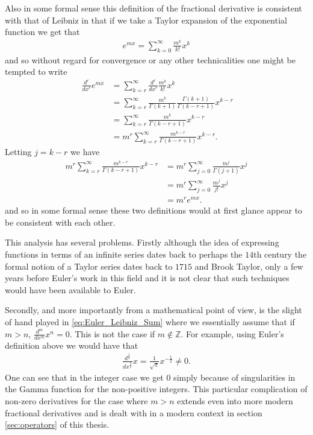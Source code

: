 Also in some formal sense this definition of the fractional derivative is consistent with that of Leibniz in that if we take a Taylor expansion of the exponential function we get that
\begin{align*}
    e^{mx} = \sum_{k=0}^\infty \frac{m^k}{k!} x^k
\end{align*}
and so without regard for convergence or any other technicalities one might be tempted to write
\begin{align}
    \label{eq:Euler_Leibniz_Sum}\
    \frac{d^r}{dx^r} e^{mx} &= \sum_{k = r}^\infty \frac{d^r}{dx^r} \frac{m^k}{k!} x^k \\
                            &= \sum_{k = r}^\infty \frac{m^k}{\Gamma(k+1)} \frac{\Gamma(k+1)}{\Gamma(k - r + 1)} x^{k-r} \\             
                            &= \sum_{k = r}^\infty \frac{m^k}{\Gamma(k - r + 1)}x^{k-r} \\
                            &= m^r \sum_{k = r}^\infty \frac{m^{k-r}}{\Gamma(k - r + 1)}x^{k-r}.
\end{align}
Letting $ j = k - r $ we have
\begin{align*}
    m^r \sum_{k = r}^\infty \frac{m^{k-r}}{\Gamma(k - r + 1)}x^{k-r}
        &= m^r \sum_{j = 0}^\infty \frac{m^{j}}{\Gamma(j + 1)}x^{j} \\
        &= m^r \sum_{j = 0}^\infty \frac{m^{j}}{j!}x^{j} \\
        &= m^r e^{mx}.
\end{align*}
and so in some formal sense these two definitions would at first glance appear to be consistent with each other.

This analysis has several problems. Firstly although the idea of expressing functions in terms of an infinite series dates back to perhaps the $ 14$th century the formal notion of a Taylor series dates back to $1715$ and Brook Taylor, only a few years before Euler's work in this field and it is not clear that such techniques would have been available to Euler. 

Secondly, and more importantly from a mathematical point of view, is the slight of hand played in \eqref{eq:Euler_Leibniz_Sum} where we essentially assume that if $ m > n $, $ \frac{d^m}{dx^m} x^n = 0 $. This is not the case if $ m \not\in \mathbb{Z} $. For example, using Euler's definition above we would have that
\begin{align*}
    \frac{d^\frac{3}{2}}{dx^\frac{3}{2}} x = \frac{1}{\sqrt{\pi}} x^{-\frac{1}{2}} \neq 0.
\end{align*}
One can see that in the integer case we get $ 0 $ simply because of singularities in the Gamma function for the non-positive integers. This particular complication of non-zero derivatives for the case where $ m > n $ extends even into more modern fractional derivatives and is dealt with in a modern context in section \ref{sec:operators} of this thesis.

